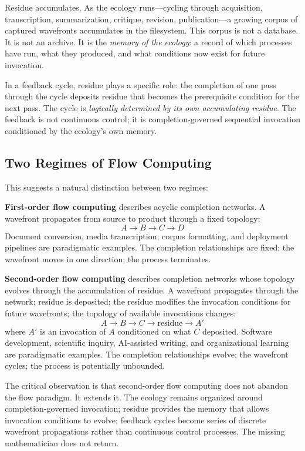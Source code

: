 \documentclass[12pt, a4paper]{article}
\begin{document}
Residue accumulates. As the ecology runs---cycling through
acquisition, transcription, summarization, critique, revision,
publication---a growing corpus of captured wavefronts accumulates
in the filesystem. This corpus is not a database. It is not an
archive. It is the \emph{memory of the ecology}: a record of which
processes have run, what they produced, and what conditions now
exist for future invocation.

In a feedback cycle, residue plays a specific role: the completion
of one pass through the cycle deposits residue that becomes the
prerequisite condition for the next pass. The cycle is
\emph{logically determined by its own accumulating residue}.
The feedback is not continuous control; it is completion-governed
sequential invocation conditioned by the ecology's own memory.

\subsection{Two Regimes of Flow Computing}

This suggests a natural distinction between two regimes:

\textbf{First-order flow computing} describes acyclic completion
networks. A wavefront propagates from source to product through
a fixed topology:
\[A \to B \to C \to D\]
Document conversion, media transcription, corpus formatting,
and deployment pipelines are paradigmatic examples. The completion
relationships are fixed; the wavefront moves in one direction;
the process terminates.

\textbf{Second-order flow computing} describes completion networks
whose topology evolves through the accumulation of residue. A
wavefront propagates through the network; residue is deposited;
the residue modifies the invocation conditions for future
wavefronts; the topology of available invocations changes:
\[A \to B \to C \to \text{residue} \to A'\]
where $A'$ is an invocation of $A$ conditioned on what $C$
deposited. Software development, scientific inquiry, AI-assisted
writing, and organizational learning are paradigmatic examples.
The completion relationships evolve; the wavefront cycles; the
process is potentially unbounded.

The critical observation is that second-order flow computing does
not abandon the flow paradigm. It extends it. The ecology remains
organized around completion-governed invocation; residue provides
the memory that allows invocation conditions to evolve; feedback
cycles become series of discrete wavefront propagations rather than
continuous control processes. The missing mathematician does not
return.
\end{document}
